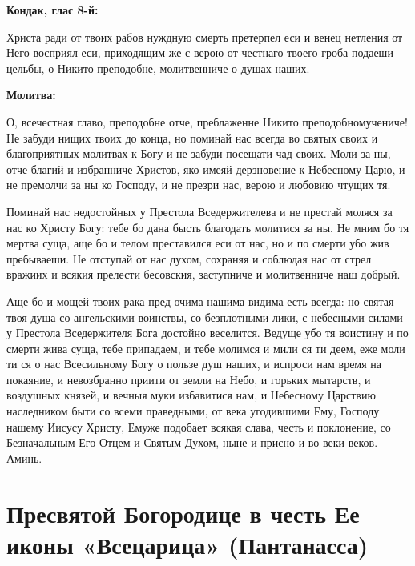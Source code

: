 \bfseries Кондак, глас 8-й:\normalfont{}\nopagebreak


Христа ради от твоих рабов нуждную смерть претерпел еси и венец нетления от Него восприял еси, приходящим же с верою от честнаго твоего гроба подаеши цельбы, о Никито преподобне, молитвенниче о душах наших.


\medskip


\bfseries Молитва:\normalfont{}\nopagebreak


О, всечестная главо, преподобне отче, преблаженне Никито преподобномучениче! Не забуди нищих твоих до конца, но поминай нас всегда во святых своих и благоприятных молитвах к Богу и не забуди посещати чад своих. Моли за ны, отче благий и избранниче Христов, яко имеяй дерзновение к Небесному Царю, и не премолчи за ны ко Господу, и не презри нас, верою и любовию чтущих тя. 

Поминай нас недостойных у Престола Вседержителева и не престай моляся за нас ко Христу Богу: тебе бо дана бысть благодать молитися за ны. Не мним бо тя мертва суща, аще бо и телом преставился еси от нас, но и по смерти убо жив пребываеши. Не отступай от нас духом, сохраняя и соблюдая нас от стрел вражиих и всякия прелести бесовския, заступниче и молитвенниче наш добрый. 

Аще бо и мощей твоих рака пред очима нашима видима есть всегда: но святая твоя душа со ангельскими воинствы, со безплотными лики, с небесными силами у Престола Вседержителя Бога достойно веселится. Ведуще убо тя воистину и по смерти жива суща, тебе припадаем, и тебе молимся и мили ся ти деем, еже моли ти ся о нас Всесильному Богу о пользе душ наших, и испроси нам время на покаяние, и невозбранно приити от земли на Небо, и горьких мытарств, и воздушных князей, и вечныя муки избавитися нам, и Небесному Царствию наследником быти со всеми праведными, от века угодившими Ему, Господу нашему Иисусу Христу, Емуже подобает всякая слава, честь и поклонение, со Безначальным Его Отцем и Святым Духом, ныне и присно и во веки веков. Аминь.


\bigskip\bigskip\mychapterending


 

\section{Пресвятой Богородице в честь Ее иконы «Всецарица» (Пантанасса)}
 


